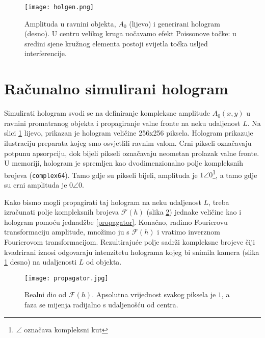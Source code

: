 \documentclass[hidelinks]{ferseminar}
\begin{document}
\begin{figure}
\texttt{[image: holgen.png]}
\caption{Amplituda u ravnini objekta, $A_0$ (lijevo) i generirani hologram (desno). U centru velikog kruga uočavamo efekt Poissonove točke: u sredini sjene kružnog elementa postoji svijetla točka usljed interferencije.}
\label{simulation}
\end{figure}

\section{Računalno simulirani hologram}
Simulirati hologram svodi se na definiranje kompleksne amplitude $A_0(x,y)$ u ravnini promatranog objekta i propagiranje valne fronte na neku udaljenost $L$. Na slici \ref{simulation} lijevo, prikazan je hologram veličine 256x256 piksela. Hologram prikazuje ilustraciju preparata kojeg smo osvjetlili ravnim valom. Crni pikseli označavaju potpunu apsorpciju, dok bijeli pikseli označavaju neometan prolazak valne fronte. U memoriji, hologram je spremljen kao dvodimenzionalno polje kompleksnih brojeva (\lstinline{complex64}). Tamo gdje su pikseli bijeli, amplituda je $1\angle0$\footnote{$\angle$ označava kompleksni kut}, a tamo gdje su crni amplituda je $0\angle0$.

Kako bismo mogli propagirati taj hologram na neku udaljenost $L$, treba izračunati polje kompleksnih brojeva $\mathcal{F}(h)$ (slika \ref{propagator_img}) jednake veličine kao i hologram pomoću jednadžbe \ref{propagator}. Konačno, radimo Fourierovu transformaciju amplitude, množimo ju s $\mathcal{F}(h)$ i vratimo inverznom Fourierovom transformacijom. Rezultirajuće polje sadrži kompleksne brojeve čiji kvadrirani iznosi odgovaraju intenzitetu holograma kojeg bi snimila kamera (slika \ref{simulation} desno) na udaljenosti $L$ od objekta.

\begin{figure}
\centering
\texttt{[image: propagator.jpg]}
\caption{Realni dio od $\mathcal{F}(h)$. Apsolutna vrijednost svakog piksela je $1$, a faza se mijenja radijalno s udaljenošću od centra.}
\label{propagator_img}
\end{figure}
\end{document}
